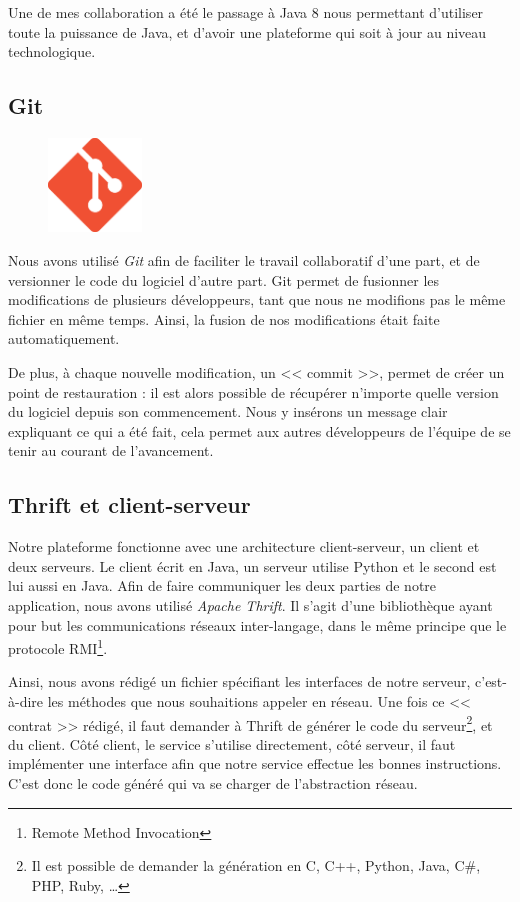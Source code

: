 Une de mes collaboration a été le passage à Java 8 nous permettant d'utiliser toute la puissance de Java, et d'avoir une plateforme qui soit à jour au niveau technologique.

\subsection{Git}
\begin{figure}
\vspace{-15px}
	\includegraphics[width=2.5cm]{contents/images/logoGit.png}
\end{figure}
Nous avons utilisé \textit{Git} afin de faciliter le travail collaboratif d'une part, et de versionner le code du logiciel d'autre part. Git permet de fusionner les
modifications de plusieurs développeurs, tant que nous ne modifions pas le même fichier en même temps. Ainsi, la fusion de nos modifications était faite automatiquement. 

De plus, à chaque nouvelle modification, un << commit >>, permet de créer un point de restauration : il est alors possible de
récupérer n'importe quelle version du logiciel depuis son commencement. Nous y insérons un message clair expliquant ce qui a été fait, cela permet aux autres développeurs de l'équipe de se tenir au courant de l'avancement.

\subsection{Thrift et client-serveur}\label{thrift}
Notre plateforme fonctionne avec une architecture client-serveur, un client et deux serveurs. Le client écrit en Java, un serveur utilise
Python et le second est lui aussi en Java. Afin de faire communiquer les deux parties de notre application, nous avons utilisé \textit{Apache Thrift}. Il s'agit d'une bibliothèque ayant pour but les communications réseaux inter-langage, dans le même principe que le protocole RMI\footnote{Remote Method Invocation}.

Ainsi, nous avons rédigé un fichier spécifiant les interfaces de notre serveur, c'est-à-dire les méthodes que nous souhaitions appeler en réseau. Une fois ce << contrat >> rédigé, il faut demander à Thrift de générer le code du serveur\footnote{Il est possible de demander la génération en C, C++, Python, Java, C\#, PHP, Ruby, \ldots}, et du client. Côté client, le service s'utilise directement, côté serveur, il faut implémenter une interface afin que notre service effectue les bonnes instructions. C'est donc le code généré qui va se charger de l'abstraction réseau.

